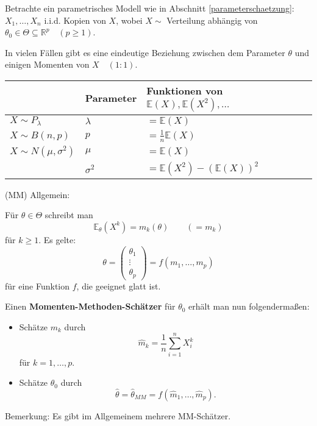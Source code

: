 \documentclass{tstextbook}
\newcommand{\E}{\mathbb E}
\newcommand{\R}{\mathbb R}
\begin{document}
Betrachte ein parametrisches Modell wie in Abschnitt \ref{parameterschaetzung}:
$ X_1,\ldots,X_n $ i.i.d. Kopien von $ X $, wobei $ X \sim $ Verteilung abhängig von $ \theta_0 \in \Theta \subseteq \R^p \quad (p\ge1) $.

In vielen Fällen gibt es eine eindeutige Beziehung zwischen dem Parameter $ \theta $ und einigen Momenten von $ X \quad (1:1) $.

\begin{example}
	
	
	\begin{tabular}{l|ll}
								& Parameter 	& Funktionen von $ \E(X), \E(X^2),\ldots $ \\
		\midrule
		$ X\sim P_\lambda $ 	& $ \lambda	$	& $ = \E(X) $\\
		\midrule
		$ X\sim B(n,p) $ 		& $ p $			& $ = \frac{1}{n} \E(X) $\\
		\midrule
		$ X\sim N(\mu, \sigma^2) $ & $ \mu $	& $ = \E(X) $\\
								& $ \sigma^2 $	& $ = \E(X^2)-(\E(X))^2 $
	\end{tabular}
\end{example}

	\begin{remark}
		(MM) Allgemein:
	
		Für $ \theta \in \Theta $ schreibt man 
		\[
		\E_\theta(X^k) = m_k(\theta) \qquad (=m_k)
		\]
		für $ k\ge1 $. Es gelte: 
		\[
		\theta = \begin{pmatrix}
			\theta_1 \\ \vdots \\ \theta_p
		\end{pmatrix} = f\left(m_1,\ldots,m_p\right)
		\]
		für eine Funktion $ f $, die geeignet glatt ist.
		
	\end{remark}


Einen \textbf{Momenten-Methoden-Schätzer}  für $ \theta_0 $ erhält man nun folgendermaßen: 
	\begin{itemize}
		\item Schätze $ m_k $ durch \[ \hat{m}_k = \frac{1}{n} \sum_{i=1}^{n} X_i^k \] für $ k=1,\ldots,p $.
		\item Schätze $ \theta_0 $ durch \[\hat{\theta} = {\hat{\theta}}_{MM} = f\left(\hat{m}_1,\ldots,\hat{m}_p \right). \]
	\end{itemize}

\begin{remark}
	Bemerkung: Es gibt im Allgemeinem mehrere MM-Schätzer.
\end{remark}
\end{document}
